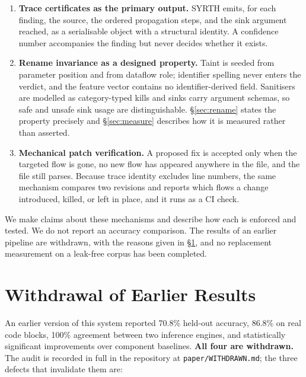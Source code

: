 \documentclass[12pt,a4paper]{article}
\begin{document}
\begin{enumerate}
    \item \textbf{Trace certificates as the primary output.} SYRTH emits, for each finding, the source, the ordered propagation steps, and the sink argument reached, as a serialisable object with a structural identity. A confidence number accompanies the finding but never decides whether it exists.

    \item \textbf{Rename invariance as a designed property.} Taint is seeded from parameter position and from dataflow role; identifier spelling never enters the verdict, and the feature vector contains no identifier-derived field. Sanitisers are modelled as category-typed kills and sinks carry argument schemas, so safe and unsafe sink usage are distinguishable. \S\ref{sec:rename} states the property precisely and \S\ref{sec:measure} describes how it is measured rather than asserted.

    \item \textbf{Mechanical patch verification.} A proposed fix is accepted only when the targeted flow is gone, no new flow has appeared anywhere in the file, and the file still parses. Because trace identity excludes line numbers, the same mechanism compares two revisions and reports which flows a change introduced, killed, or left in place, and it runs as a CI check.
\end{enumerate}

We make claims about these mechanisms and describe how each is enforced and tested. We do not report an accuracy comparison. The results of an earlier pipeline are withdrawn, with the reasons given in \S\ref{sec:withdrawal}, and no replacement measurement on a leak-free corpus has been completed.

\section{Withdrawal of Earlier Results}
\label{sec:withdrawal}

An earlier version of this system reported 70.8\% held-out accuracy, 86.8\% on real code blocks, 100\% agreement between two inference engines, and statistically significant improvements over component baselines. \textbf{All four are withdrawn.} The audit is recorded in full in the repository at \texttt{paper/WITHDRAWN.md}; the three defects that invalidate them are:
\end{document}
